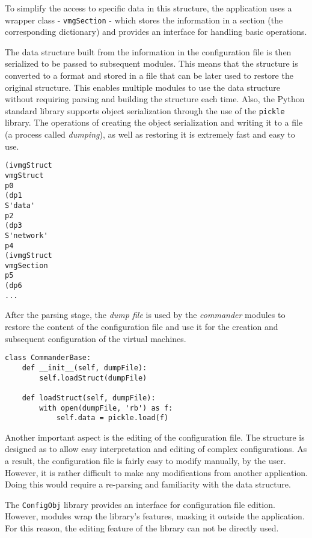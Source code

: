 To simplify the access to specific data in this structure, the application uses 
a wrapper class - \texttt{vmgSection} - which stores the information in a 
section (the corresponding dictionary) and provides an interface for handling 
basic operations.

The data structure built from the information in the configuration file is then 
serialized to be passed to subsequent modules. This means that the structure 
is converted to a format and stored in a file that can be later used to restore 
the original structure. This enables multiple modules to use the data structure 
without requiring parsing and building the structure each time. Also, the 
Python standard library supports object serialization through the use of the 
\texttt{pickle} library. The operations of creating the object serialization and 
writing it to a file (a process called \emph{dumping}), as well as restoring 
it is extremely fast and easy to use.
\\
\lstset{language=Python,caption=Serialized representation of a configuration
file,label=lst:dump-file}
\begin{lstlisting}
(ivmgStruct
vmgStruct
p0
(dp1
S'data'
p2
(dp3
S'network'
p4
(ivmgStruct
vmgSection
p5
(dp6
...
\end{lstlisting}

After the parsing stage, the \emph{dump file} is used by the 
\emph{commander} modules to restore the content of the configuration file 
and use it for the creation and subsequent configuration of the virtual 
machines.
\\
\lstset{language=Python,caption=Restoring the data structure,
label=lst:load-dump-file}
\begin{lstlisting}
class CommanderBase:
	def __init__(self, dumpFile):
		self.loadStruct(dumpFile)

	def loadStruct(self, dumpFile):
		with open(dumpFile, 'rb') as f:
			self.data = pickle.load(f)
\end{lstlisting}

Another important aspect is the editing of the configuration file. The 
structure is designed as to allow easy interpretation and editing of complex 
configurations. As a result, the configuration file is fairly easy to modify 
manually, by the user. However, it is rather difficult to make any 
modifications from another application. Doing this would require a re-parsing 
and familiarity with the data structure.

The \texttt{ConfigObj} library provides an interface for configuration file 
edition. However, \texttt{\project} modules wrap the library's features, 
masking it outside the application. For this reason, the editing feature of 
the library can not be directly used.

